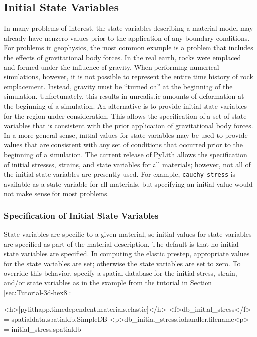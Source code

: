 \subsection{Initial State Variables}
\label{sec:materials:reference:state}

In many problems of interest, the state variables describing a material
model may already have nonzero values prior to the application of
any boundary conditions. For problems in geophysics, the most common
example is a problem that includes the effects of gravitational body
forces. In the real earth, rocks were emplaced and formed under the
influence of gravity. When performing numerical simulations, however,
it is not possible to represent the entire time history of rock emplacement.
Instead, gravity must be ``turned on'' at the beginning of the simulation.
Unfortunately, this results in unrealistic amounts of deformation
at the beginning of a simulation. An alternative is to provide initial
state variables for the region under consideration. This allows the
specification of a set of state variables that is consistent with
the prior application of gravitational body forces. In a more general
sense, initial values for state variables may be used to provide values
that are consistent with any set of conditions that occurred prior
to the beginning of a simulation. The current release of PyLith allows
the specification of initial stresses, strains, and state variables
for all materials; however, not all of the initial state variables
are presently used. For example, \texttt{cauchy\_stress} is available
as a state variable for all materials, but specifying an initial value
would not make sense for most problems.


\subsubsection{Specification of Initial State Variables}

State variables are specific to a given material, so initial values
for state variables are specified as part of the material description.
The default is that no initial state variables are specified. In computing
the elastic prestep, appropriate values for the state variables are
set; otherwise the state variables are set to zero. To override this
behavior, specify a spatial database for the initial stress, strain,
and/or state variables as in the example from the tutorial in Section
\vref{sec:Tutorial-3d-hex8}:
\begin{cfg}
<h>[pylithapp.timedependent.materials.elastic]</h>
<f>db_initial_stress</f> = spatialdata.spatialdb.SimpleDB
<p>db_initial_stress.iohandler.filename<p> = initial\_stress.spatialdb
\end{cfg}

